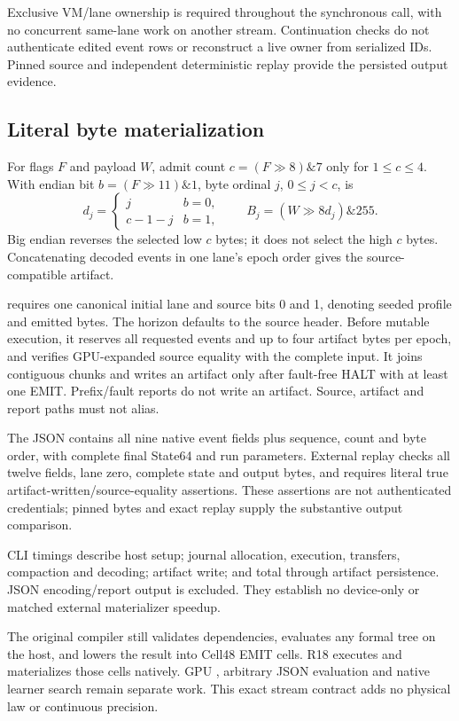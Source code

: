 Exclusive VM/lane ownership is required throughout the synchronous call,
with no concurrent same-lane work on another stream. Continuation checks
do not authenticate edited event rows or reconstruct a live owner from
serialized IDs. Pinned source and independent deterministic replay provide
the persisted output evidence.

\subsection{Literal byte materialization}
For flags $F$ and payload $W$, admit count
$c=(F\gg8)\mathbin{\&}7$ only for $1\le c\le4$. With endian bit
$b=(F\gg11)\mathbin{\&}1$, byte ordinal $j$, $0\le j<c$, is
\begin{equation}
 d_j=\begin{cases}j&b=0,\\c-1-j&b=1,\end{cases}
 \qquad B_j=(W\gg8d_j)\mathbin{\&}255.
\end{equation}
Big endian reverses the selected low $c$ bytes; it does not select the high
$c$ bytes. Concatenating decoded events in one lane's epoch order gives
the source-compatible artifact.

 requires one canonical initial lane and source
bits 0 and 1, denoting seeded profile and emitted bytes. The horizon defaults
to the source header. Before mutable execution, it reserves all requested
events and up to four artifact bytes per epoch, and verifies GPU-expanded
source equality with the complete input. It joins contiguous chunks and
writes an artifact only after fault-free HALT with at least one EMIT.
Prefix/fault reports do not write an artifact. Source, artifact and report
paths must not alias.

The JSON contains all nine native event fields plus sequence, count and
byte order, with complete final State64 and run parameters. External replay
checks all twelve fields, lane zero, complete state and output bytes, and
requires literal true artifact-written/source-equality assertions. These
assertions are not authenticated credentials; pinned bytes and exact replay
supply the substantive output comparison.

CLI timings describe host setup; journal allocation, execution, transfers,
compaction and decoding; artifact write; and total through artifact
persistence. JSON encoding/report output is excluded. They establish no
device-only or matched external materializer speedup.

The original compiler still validates dependencies, evaluates any formal
tree on the host, and lowers the result into Cell48 EMIT cells. R18 executes
and materializes those cells natively. GPU , arbitrary
JSON evaluation and native learner search remain separate work. This exact
stream contract adds no physical law or continuous precision.
\clearpage

